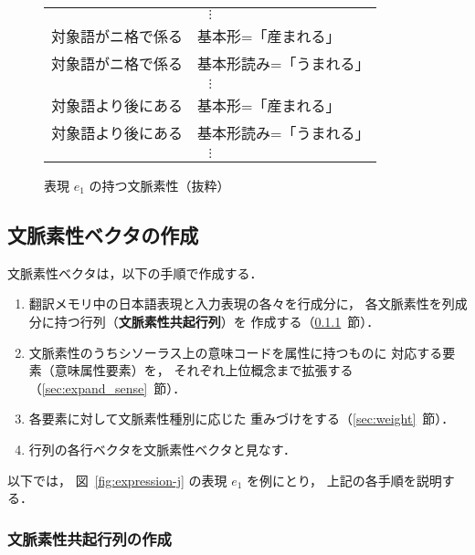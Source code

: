 \begin{figure}[tp]
\begin{center}
\begin{minipage}{.75\textwidth}
\begin{center}
\begin{tabular}{r@{\,:\,}l}
     \multicolumn{2}{c}{$\vdots$}\\
     対象語がニ格で係る & 基本形=\hspace*{-.25zw}「産まれる」\\
     対象語がニ格で係る & 基本形読み=\hspace*{-.25zw}「うまれる」\\
     \multicolumn{2}{c}{$\vdots$}\\
     対象語より後にある & 基本形=\hspace*{-.25zw}「産まれる」\\
     対象語より後にある & 基本形読み=\hspace*{-.25zw}「うまれる」\\
     \multicolumn{2}{c}{$\vdots$}
    \end{tabular}
   \end{center}
  \end{minipage}
  
 \end{center}
 \caption{表現 $e_1$ の持つ文脈素性（抜粋）}
 \label{fig:e1-context_feature}
\end{figure}


\subsection{文脈素性ベクタの作成}
文脈素性ベクタは，以下の手順で作成する．
\begin{enumerate}
 \item 翻訳メモリ中の日本語表現と入力表現の各々を行成分に，
       各文脈素性を列成分に持つ行列（{\bf 文脈素性共起行列}）を
       作成する（\ref{sec:appearance}~節）．
 \item 文脈素性のうちシソーラス上の意味コードを属性に持つものに
       対応する要素（意味属性要素）を，
       それぞれ上位概念まで拡張する（\ref{sec:expand_sense}~節）．
 \item 各要素に対して文脈素性種別に応じた
       重みづけをする（\ref{sec:weight}~節）．
 \item 行列の各行ベクタを文脈素性ベクタと見なす．
\end{enumerate}

以下では，
図~\ref{fig:expression-j} の表現 $e_1$ を例にとり，
上記の各手順を説明する．

\subsubsection{文脈素性共起行列の作成}
\label{sec:appearance}

